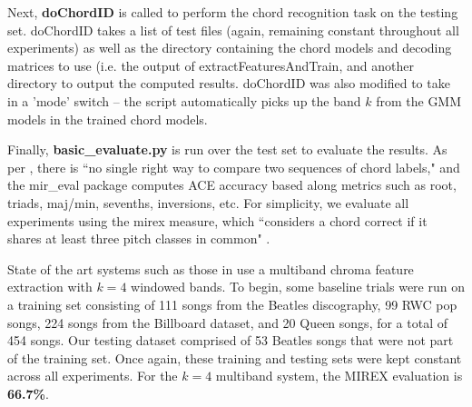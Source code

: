 \documentclass{article}
\begin{document}
	Next, \textsf{\textbf{doChordID}} is called to perform the chord recognition task on the testing set. \textsf{doChordID} takes a list of test files (again, remaining constant throughout all experiments) as well as the directory containing the chord models and decoding matrices to use (i.e. the output of \textsf{extractFeaturesAndTrain}, and another directory to output the computed results. \textsf{doChordID} was also modified to take in a 'mode' switch -- the script automatically picks up the band $k$ from the GMM models in the trained chord models.
	
	Finally, \textsf{\textbf{basic\_evaluate.py}} is run over the test set to evaluate the results. As per \cite{raffel2014mir}, there is ``no single right way to compare two sequences of chord labels," and the \textsf{mir\_eval} package computes ACE accuracy based along metrics such as root, triads, maj/min, sevenths, inversions, etc. For simplicity, we evaluate all experiments using the \textsf{mirex} measure, which ``considers a chord correct if it shares at least three pitch classes in common" \cite{raffel2014mir}.
	
	State of the art systems such as those in \cite{cho2014on} use a multiband chroma feature extraction with $k=4$ windowed bands. To begin, some baseline trials were run on a training set consisting of 111 songs from the Beatles discography, 99 RWC pop songs, 224 songs from the Billboard dataset, and 20 Queen songs, for a total of 454 songs. Our testing dataset comprised of 53 Beatles songs that were not part of the training set. Once again, these training and testing sets were kept constant across all experiments. For the $k=4$ multiband system, the \textsf{MIREX} evaluation is \textbf{66.7\%}.
	
\end{document}
